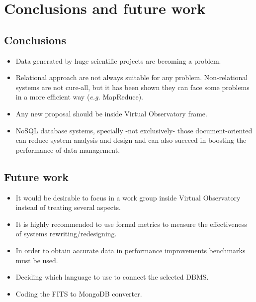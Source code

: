 \chapter{Conclusions and future work}


\section{Conclusions}

\begin{itemize}

\item Data generated by huge scientific projects are becoming a problem.

\item Relational approach are not always suitable for any problem. Non-relational systems are not cure-all, but it has been shown they can face some problems in a more efficient way (\textit{e.g.} MapReduce).

\item Any new proposal should be inside Virtual Observatory frame.

\item NoSQL database systems, specially -not exclusively- those document-oriented can reduce system analysis and design and can also succeed in boosting the performance of data management.

\end{itemize}

\section{Future work}

\begin{itemize}

\item It would be desirable to focus in a work group inside Virtual Observatory instead of treating several aspects.

\item It is highly recommended to use formal metrics to measure the effectiveness of systems rewriting/redesigning.

\item In order to obtain accurate data in performance improvements benchmarks must be used.

\item Deciding which language to use to connect the selected DBMS.

\item Coding the FITS to MongoDB converter.
\end{itemize}

